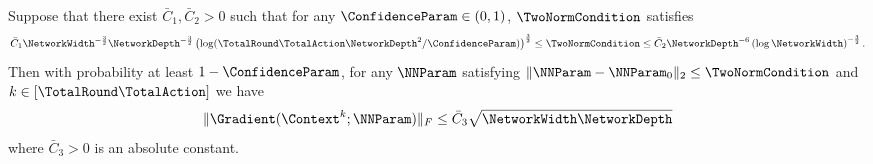 \documentclass{article}
\theoremstyle{plain}
\begin{document}
\begin{lemma} \label{aux lemma:lemma B.6 in NeuralUCB}
Suppose that there exist $\bar{C}_1, \bar{C}_2 >0 $ such that for any $\ConfidenceParam \in (0,1)$, $\TwoNormCondition$ satisfies 
%
    \begin{equation*}
        \bar{C}_1 \NetworkWidth^{-\frac{3}{2}} \NetworkDepth^{-\frac{3}{2}} \left( \log(\TotalRound \TotalAction \NetworkDepth^2 / \ConfidenceParam) \right)^{\frac{3}{2}}
        \le \TwoNormCondition \le
        \bar{C}_2 \NetworkDepth^{-6} \left( \log \NetworkWidth \right)^{-\frac{3}{2}}.        
    \end{equation*}
%
Then with probability at least $1-\ConfidenceParam$, for any $\NNParam$ satisfying $\| \NNParam - \NNParam_0 \|_2 \le \TwoNormCondition$ and $k \in [\TotalRound \TotalAction]$ we have
%
    \begin{equation*}
        \| \Gradient(\Context^k; \NNParam) \|_F \le \bar{C}_3 \sqrt{\NetworkWidth \NetworkDepth}
    \end{equation*}
%
where $\bar{C}_3 > 0$ is an absolute constant.
\end{lemma}
\end{document}
